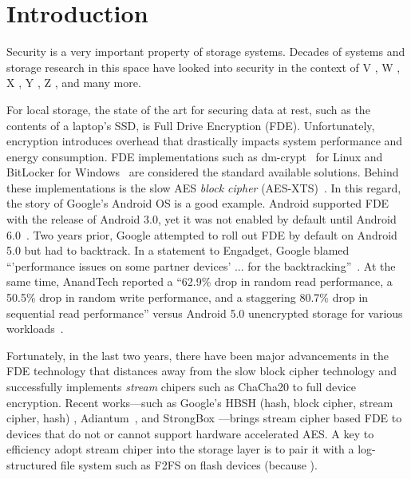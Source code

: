 \section{Introduction} \label{sec:introduction}




Security is a very important property of storage systems.  Decades of 
systems and storage research in this space have looked into security in the context of 
V \cite{v1, v2, v3}, 
W \cite{w1, w2, w3}, 
X \cite{x1, x2, x3}, 
Y \cite{y1, y2, y3}, 
Z \cite{z1, z2, z3}, 
and many more.


For local storage, the state of the art for securing data at rest, such as
the contents of a laptop's SSD, is Full Drive Encryption (FDE).
Unfortunately, encryption introduces overhead that drastically impacts
system performance and energy consumption.  FDE implementations such as
dm-crypt~\cite{dmcrypt,DmC-Android} for Linux and BitLocker for
Windows~\cite{bitlocker} are considered the standard available solutions.
Behind these implementations is the slow AES \emph{block cipher}
(AES-XTS)~\cite{XTS, XTSComments, NISTXTS}.  In this regard, the story of
Google's Android OS is a good example. Android supported FDE with the
release of Android 3.0, yet it was not enabled by default until Android
6.0~\cite{android-M-mobile-motivation}. Two years prior, Google attempted
to roll out FDE by default on Android 5.0 but had to backtrack. In a
statement to Engadget, Google blamed ``'performance issues on some partner
devices' ... for the backtracking''~\cite{google-engadget}. At the same
time, AnandTech reported a ``62.9\% drop in random read performance, a
50.5\% drop in random write performance, and a staggering 80.7\% drop in
sequential read performance'' versus Android 5.0 unencrypted storage for
various workloads~\cite{android-M-mobile-motivation-2}.



Fortunately, in the last two years, there have been major advancements in
the FDE technology that distances away from the slow block cipher
technology and successfully implements {\em stream} chipers such as
ChaCha20 to full device encryption.  Recent works---such as Google's HBSH
(hash, block cipher, stream cipher, hash) \cite{hbsh-citation???},
Adiantum~\cite{Adiantum}, and StrongBox \cite{StrongBox}---brings stream
cipher based FDE to devices that do not or cannot support hardware
accelerated AES.  A key to efficiency adopt stream chiper into the storage
layer is to pair it with a log-structured file system such as F2FS
on flash devices (because ).


